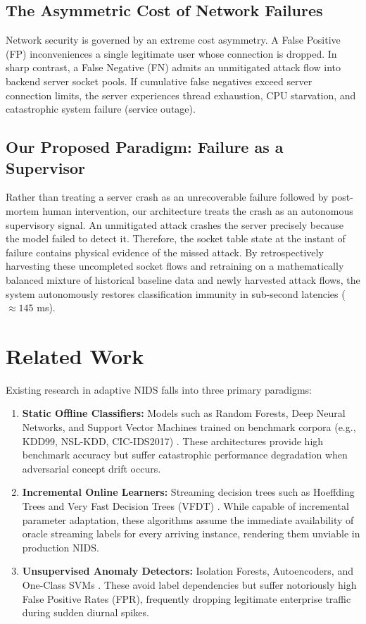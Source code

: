 \documentclass[conference]{IEEEtran}
\begin{document}
\subsection{The Asymmetric Cost of Network Failures}
Network security is governed by an extreme cost asymmetry. A False Positive (FP) inconveniences a single legitimate user whose connection is dropped. In sharp contrast, a False Negative (FN) admits an unmitigated attack flow into backend server socket pools. If cumulative false negatives exceed server connection limits, the server experiences thread exhaustion, CPU starvation, and catastrophic system failure (service outage).

\subsection{Our Proposed Paradigm: Failure as a Supervisor}
Rather than treating a server crash as an unrecoverable failure followed by post-mortem human intervention, our architecture treats the crash as an autonomous supervisory signal. An unmitigated attack crashes the server precisely because the model failed to detect it. Therefore, the socket table state at the instant of failure contains physical evidence of the missed attack. By retrospectively harvesting these uncompleted socket flows and retraining on a mathematically balanced mixture of historical baseline data and newly harvested attack flows, the system autonomously restores classification immunity in sub-second latencies ($\approx 145$ ms).

\section{Related Work}
Existing research in adaptive NIDS falls into three primary paradigms:
\begin{enumerate}
    \item \textbf{Static Offline Classifiers:} Models such as Random Forests, Deep Neural Networks, and Support Vector Machines trained on benchmark corpora (e.g., KDD99, NSL-KDD, CIC-IDS2017) \cite{sharafaldin2018}. These architectures provide high benchmark accuracy but suffer catastrophic performance degradation when adversarial concept drift occurs.
    \item \textbf{Incremental Online Learners:} Streaming decision trees such as Hoeffding Trees and Very Fast Decision Trees (VFDT) \cite{domingos2000}. While capable of incremental parameter adaptation, these algorithms assume the immediate availability of oracle streaming labels for every arriving instance, rendering them unviable in production NIDS.
    \item \textbf{Unsupervised Anomaly Detectors:} Isolation Forests, Autoencoders, and One-Class SVMs \cite{chandola2009}. These avoid label dependencies but suffer notoriously high False Positive Rates (FPR), frequently dropping legitimate enterprise traffic during sudden diurnal spikes.
\end{enumerate}
\end{document}
